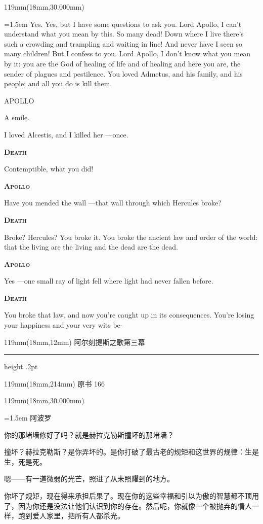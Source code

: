\documentclass{article}
\newcommand{\ENsetup}{\normalfont\color{ink}\fontsize{11}{16.5}\selectfont\emergencystretch=1.5em}
\newcommand{\ZHsetup}{\normalfont\color{ink}\fontsize{10.5}{17}\selectfont\emergencystretch=1.5em}
\newcommand{\ENspeaker}[1]{{\fontsize{9.8}{13}\selectfont\scshape\bfseries #1}\par\vspace{3pt}}
\newcommand{\ZHspeaker}[1]{{\hei\fontsize{10.3}{13}\selectfont #1}\par\vspace{3pt}}
\newcommand{\Block}[3]{\begin{textblock*}{119mm}(18mm,#1mm){#2 #3\par}\end{textblock*}}
\newcommand{\Heading}[3]{%
  \begin{textblock*}{119mm}(18mm,12mm)
    \color{quiet}\fontsize{7.5}{10}\selectfont
    #1\hfill #2\par\vspace{3mm}\hrule height .2pt
  \end{textblock*}
  \begin{textblock*}{119mm}(18mm,214mm)
    \color{quiet}\fontsize{7}{10}\selectfont #3\hfill\thepage
  \end{textblock*}
}
\begin{document}
\Block{30.000}{\ENsetup}{\sloppy
Yes. Yes, but I have some questions to ask you. Lord Apollo, I can't understand what you mean by this. So many dead! Down where I live there's such a crowding and trampling and waiting in line! And never have I seen so many children! But I confess to you. Lord Apollo, I don't know what you mean by it: you are the God of healing of life and of healing and here you are, the sender of plagues and pestilence. You loved Admetus, and his family, and his people; and all you do is kill them.\par\vspace{2pt}
APOLLO\par\vspace{2pt}
A smile.\par\vspace{2pt}
I loved Alcestis, and I killed her —once.\par\vspace{2pt}
\ENspeaker{Death}
Contemptible, what you did!\par\vspace{2pt}
\ENspeaker{Apollo}
Have you mended the wall —that wall through which Hercules broke?\par\vspace{2pt}
\ENspeaker{Death}
Broke? Hercules? You broke it. You broke the ancient law and order of the world: that the living are the living and the dead are the dead.\par\vspace{2pt}
\ENspeaker{Apollo}
Yes —one small ray of light fell where light had never fallen before.\par\vspace{2pt}
\ENspeaker{Death}
You broke that law, and now you're caught up in its consequences. You're losing your happiness and your very wits be-\par\vspace{2pt}}
\newpage
\null
\Heading{阿尔刻提斯之歌}{第三幕}{原书 166}
\Block{30.000}{\ZHsetup}{\ZHspeaker{阿波罗}你的那堵墙修好了吗？就是赫拉克勒斯撞坏的那堵墙？\par \vspace{2.2mm}\ZHspeaker{死神}撞坏？赫拉克勒斯？是你弄坏的。是你打破了最古老的规矩和这世界的规律：生是生，死是死。\par \vspace{2.2mm}\ZHspeaker{阿波罗}嗯——有一道微弱的光芒，照进了从未照耀到的地方。\par \vspace{2.2mm}\ZHspeaker{死神}你坏了规矩，现在得来承担后果了。现在你的这些幸福和引以为傲的智慧都不顶用了，因为你还是没法让他们认识到你的存在。然后呢，你就像一个被抛弃的情人一样，跑到爱人家里，把所有人都杀光。\par }
\end{document}

